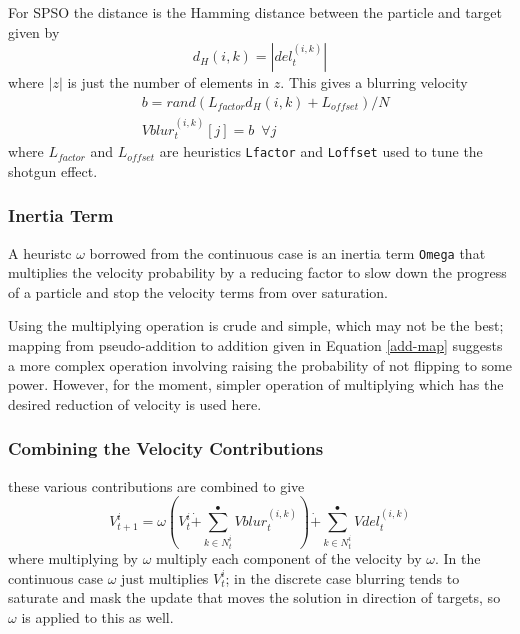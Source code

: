 \documentclass[a4paper,oneside,english]{book}
\numberwithin{equation}{section}
\numberwithin{figure}{section}
\begin{document}
For SPSO the distance is the Hamming distance between the particle and target given by
\begin{equation}\label{H-dist}
d_H(i,k)=|del_t^{(i,k)}|
\end{equation}
where $|z|$ is just the number of elements in $z$. This gives a blurring velocity
\begin{align}\label{blur-vel}
&b=rand(L_{factor}d_H(i,k)+L_{offset})/N\\
&Vblur_t^{(i,k)}[j]=b\:\; \forall j
\end{align}
where $L_{factor}$ and $L_{offset}$ are heuristics \texttt{Lfactor} and \texttt{Loffset}   used to tune the shotgun effect.
\subsubsection{Inertia Term}
A heuristc $\omega$ borrowed from the continuous case is an inertia  term \texttt{Omega} that multiplies the velocity probability by a reducing factor to slow down the progress of a particle and stop the velocity terms from over saturation.

Using the multiplying operation is crude and simple, which may not be the best; mapping from pseudo-addition to addition given in Equation \ref{add-map} suggests a more complex operation involving raising the probability of not flipping to some power. However, for the moment, simpler operation of multiplying which has the desired reduction of velocity is used here.
     
\subsubsection{Combining the Velocity Contributions}

these various contributions are combined to give
\begin{equation}\label{tot-velocity}
V_{t+1}^i=\omega\left (V_t^i\dot{+}\sum_{k \in N_t^i}^\bullet Vblur_t^{(i,k)}\right )\dot{+}\sum_{k \in N_t^i}^\bullet Vdel_t^{(i,k)}
\end{equation}
where multiplying by $\omega$ multiply each component of the velocity by $\omega$. In the continuous case  $\omega$ just multiplies $V_t^i$;
in the discrete case blurring tends to saturate and mask the update that moves the solution in direction of targets, so $\omega$ is applied to this as well.
         
\end{document}
